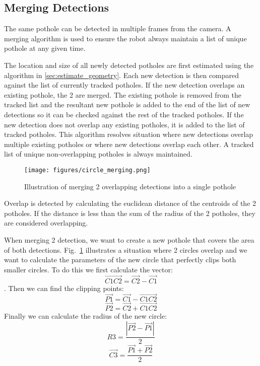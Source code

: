 \documentclass[conference]{IEEEtran}
\begin{document}
\subsection{Merging Detections}

The same pothole can be detected in multiple frames from the camera. A merging algorithm is used to ensure the robot always maintain a list of unique pothole at any given time.

The location and size of all newly detected potholes are first estimated using the algorithm in \ref{sec:estimate_geometry}. Each new detection is then compared against the list of currently tracked potholes. If the new detection overlaps an existing pothole, the 2 are merged. The existing pothole is removed from the tracked list and the resultant new pothole is added to the end of the list of new detections so it can be checked against the rest of the tracked potholes. If the new detection does not overlap any existing potholes, it is added to the list of tracked potholes. This algorithm resolves situation where new detections overlap multiple existing potholes or where new detections overlap each other. A tracked list of unique non-overlapping potholes is always maintained.

\begin{figure}
    \centering
    \texttt{[image: figures/circle\_merging.png]}
    \caption{Illustration of merging 2 overlapping detections into a single pothole}
    \label{fig:merging}
\end{figure}

Overlap is detected by calculating the euclidean distance of the centroids of the 2 potholes. If the distance is less than the sum of the radius of the 2 potholes, they are considered overlapping.

When merging 2 detection, we want to create a new pothole that covers the area of both detections. Fig.~\ref{fig:merging} illustrates a situation where 2 circles overlap and we want to calculate the parameters of the new circle that perfectly clips both smaller circles. To do this we first calculate the vector:
 \[\overrightarrow{C1C2} = \overrightarrow{C2} - \overrightarrow{C1}\].
Then we can find the clipping points:
\[\overrightarrow{P1} = \overrightarrow{C1} - \overrightarrow{C1C2}\]
\[\overrightarrow{P2} = \overrightarrow{C2} + \overrightarrow{C1C2}\]
Finally we can calculate the radius of the new circle:
\[R3 = \frac{|\overrightarrow{P2} - \overrightarrow{P1}|}{2}\]
\[\overrightarrow{C3} = \frac{\overrightarrow{P1} + \overrightarrow{P2}}{2}\]
\end{document}
